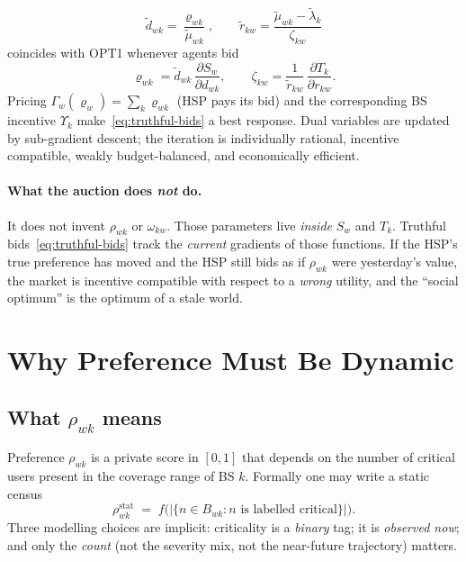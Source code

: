 \documentclass[journal,a4paper,10pt]{IEEEtran}
\begin{document}
\begin{equation}
  \tilde d_{wk}=\frac{\varrho_{wk}}{\tilde\mu_{wk}},\qquad
  \tilde r_{kw}=\frac{\tilde\mu_{wk}-\tilde\lambda_k}{\zeta_{kw}}
  \label{eq:alloc}
\end{equation}
coincides with OPT1 whenever agents bid
\begin{equation}
  \varrho_{wk}=\tilde d_{wk}\,\frac{\partial S_w}{\partial d_{wk}},
  \qquad
  \zeta_{kw}=\frac{1}{\tilde r_{kw}}\,\frac{\partial T_k}{\partial r_{kw}}.
  \label{eq:truthful-bids}
\end{equation}
Pricing \(\Gamma_w(\boldsymbol{\varrho}_w)=\sum_k\varrho_{wk}\) (HSP pays its bid) and the corresponding BS incentive \(\Upsilon_k\) make~\eqref{eq:truthful-bids} a best response. Dual variables are updated by sub-gradient descent; the iteration is individually rational, incentive compatible, weakly budget-balanced, and economically efficient.

\paragraph{What the auction does \emph{not} do.}
It does not invent \(\rho_{wk}\) or \(\omega_{kw}\). Those parameters live \emph{inside} \(S_w\) and \(T_k\). Truthful bids~\eqref{eq:truthful-bids} track the \emph{current} gradients of those functions. If the HSP's true preference has moved and the HSP still bids as if \(\rho_{wk}\) were yesterday's value, the market is incentive compatible with respect to a \emph{wrong} utility, and the ``social optimum'' is the optimum of a stale world.

\section{Why Preference Must Be Dynamic}
\label{sec:why-dyn}

\subsection{What \(\rho_{wk}\) means}
Preference \(\rho_{wk}\) is a private score in \([0,1]\) that depends on the number of critical users present in the coverage range of BS \(k\). Formally one may write a static census
\begin{equation}
  \rho_{wk}^{\mathrm{stat}}
  \;=\;
  f\bigl(\lvert\{n\in B_{wk}: n\text{ is labelled critical}\}\rvert\bigr).
  \label{eq:rho-static}
\end{equation}
Three modelling choices are implicit: criticality is a \emph{binary} tag; it is \emph{observed now}; and only the \emph{count} (not the severity mix, not the near-future trajectory) matters.
\end{document}
